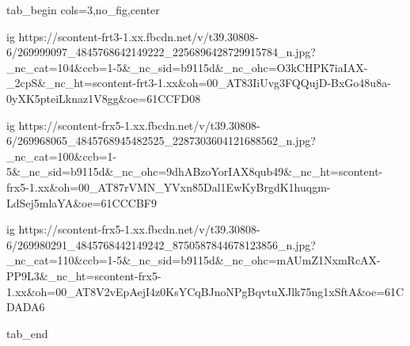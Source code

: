  
 
 
 
 


\ifcmt
  tab_begin cols=3,no_fig,center

    ig https://scontent-frt3-1.xx.fbcdn.net/v/t39.30808-6/269999097_4845768642149222_2256896428729915784_n.jpg?_nc_cat=104&ccb=1-5&_nc_sid=b9115d&_nc_ohc=O3kCHPK7iaIAX-_2cpS&_nc_ht=scontent-frt3-1.xx&oh=00_AT83IiUvg3FQQujD-BxGo48u8a-0yXK5pteiLknaz1V8gg&oe=61CCFD08

    ig https://scontent-frx5-1.xx.fbcdn.net/v/t39.30808-6/269968065_4845768945482525_2287303604121688562_n.jpg?_nc_cat=100&ccb=1-5&_nc_sid=b9115d&_nc_ohc=9dhABzoYorIAX8qub49&_nc_ht=scontent-frx5-1.xx&oh=00_AT87rVMN_YVxn85Dal1EwKyBrgdK1huqgm-LdSej5mlaYA&oe=61CCCBF9

    ig https://scontent-frx5-1.xx.fbcdn.net/v/t39.30808-6/269980291_4845768442149242_8750587844678123856_n.jpg?_nc_cat=110&ccb=1-5&_nc_sid=b9115d&_nc_ohc=mAUmZ1NxmRcAX-PP9L3&_nc_ht=scontent-frx5-1.xx&oh=00_AT8V2vEpAejI4z0KsYCqBJnoNPgBqvtuXJlk75ng1xSftA&oe=61CDADA6

  tab_end
\fi
